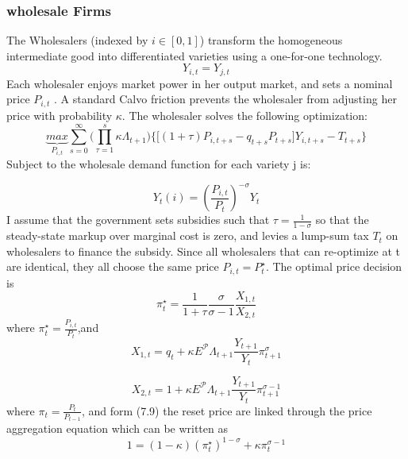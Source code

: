 \documentclass[10pt,math=newtx,citestyle=gb7714-2015,bibstyle=gb7714-2015]{elegantbook}
\begin{document}
{{{			\subsubsection{wholesale Firms}
			The Wholesalers (indexed by $i \in [0, 1]$) transform the homogeneous intermediate good into differentiated varieties using a one-for-one technology.
			\begin{equation}
				Y_{i,t}=Y_{j,t}
			\end{equation}
			Each wholesaler enjoys market power in her output market, and sets a nominal price $P_{i,t}$ . A standard Calvo friction prevents the wholesaler from adjusting her price with probability $\kappa$. The wholesaler solves the following optimization:
			\begin{equation*}
				\underbrace{max}_{P_{i,t}}\sum_{s=0}^{\infty}\bigg(\prod_{\tau=1}^{s}\kappa \Lambda_{t+1}\bigg)\biggl\{\bigg[(1+\tau)P_{i,{t+s}}-q_{t+s}P_{t+s}\bigg]Y_{i,t+s}-T_{t+s}\biggr\}
			\end{equation*}
			Subject to the wholesale demand function for each variety j is:
			
			\begin{equation*}
				Y_t(i)=\left(\frac{P_{i,t}}{P_t}\right)^{-\sigma}Y_t
			\end{equation*}
			I assume that the government sets subsidies such that $\tau =\frac{1}{1-\sigma}$ so that the steady-state markup over marginal cost is zero, and levies a lump-sum tax $T_{t}$ on wholesalers to finance the subsidy. Since all wholesalers that can re-optimize at t are identical, they all choose the
			same price $P_{i,t} = P_t^\star$. The optimal price decision is
			\begin{equation}
				\pi_t^\star=\frac{1}{1+\tau}\frac{\sigma}{\sigma-1}\frac{X_{1,t}}{X_{2,t}}
			\end{equation}
			where $\pi_t^\star=\frac{P_{i,t}}{P_t}$,and
			\begin{equation}
				X_{1,t}=q_t+\kappa \mathit{E}^{\mathcal{P}}\Lambda_{t+1}\frac{Y_{t+1}}{Y_t}\pi_{t+1}^{\sigma}
			\end{equation}
			
			\begin{equation}
				X_{2,t}=1+\kappa \mathit{E}^{\mathcal{P}}\Lambda_{t+1}\frac{Y_{t+1}}{Y_t}\pi_{t+1}^{\sigma-1}
			\end{equation}
			where $\pi_t=\frac{P_t}{P_{t-1}}$, and form (7.9) the reset price are linked through the price aggregation equation which can be written as
			\begin{equation}
				1=(1-\kappa)(\pi_t^\star)^{1-\sigma}+\kappa \pi_t^{\sigma-1}
			\end{equation}
			
}}}
\end{document}
